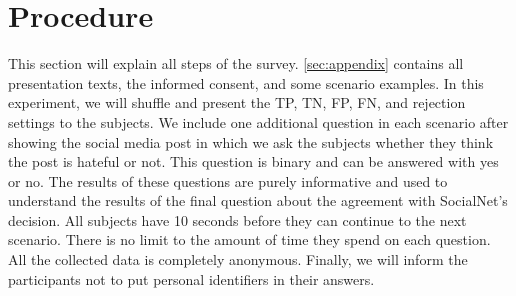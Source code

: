 \documentclass[a4paper]{article}
\begin{document}
\section{Procedure}
This section will explain all steps of the survey. \autoref{sec:appendix} contains all presentation texts, the informed consent, and some scenario examples. In this experiment, we will shuffle and present the TP, TN, FP, FN, and rejection settings to the subjects. We include one additional question in each scenario after showing the social media post in which we ask the subjects whether they think the post is hateful or not. This question is binary and can be answered with yes or no. The results of these questions are purely informative and used to understand the results of the final question about the agreement with SocialNet's decision. All subjects have 10 seconds before they can continue to the next scenario. There is no limit to the amount of time they spend on each question. All the collected data is completely anonymous. Finally, we will inform the participants not to put personal identifiers in their answers.
\end{document}
